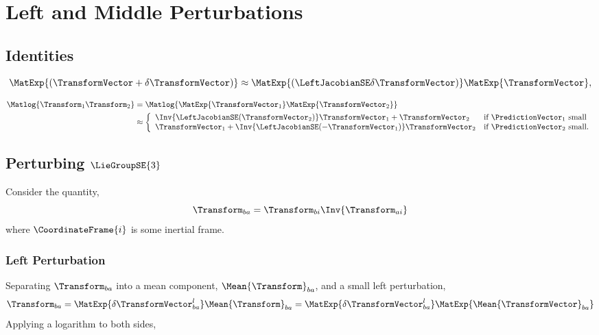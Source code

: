 \chapter{Left and Middle Perturbations}

\section{Identities}
\begin{equation}
\label{eq:identity_dxi}
\MatExp{( \TransformVector + \delta \TransformVector)} \approx \MatExp{(\LeftJacobianSE \delta \TransformVector)} \MatExp{\TransformVector},
\end{equation}

\begin{align}
\label{eq:identity_xi_small}
\Matlog{\Transform_1 \Transform_2} &= \Matlog{ \MatExp{\TransformVector_1} \MatExp{\TransformVector_2} } \nonumber \\
								  &\approx \left\{
	\begin{array}{ll}
		\Inv{\LeftJacobianSE(\TransformVector_2)} \TransformVector_1 + \TransformVector_2   & \mbox{if } \PredictionVector_1 ~ \mbox{small} \\
		\TransformVector_1 + \Inv{\LeftJacobianSE(-\TransformVector_1)} \TransformVector_2 & \mbox{if } \PredictionVector_2 ~ \mbox{small}.
	\end{array}
\right.
\end{align}

\section{Perturbing $\LieGroupSE{3}$}
Consider the quantity,
\begin{equation}
	\Transform_{ba} = \Transform_{bi} \Inv{\Transform_{ai}}
\end{equation}
where $\CoordinateFrame{i}$ is some inertial frame.


\subsection{Left Perturbation}
Separating $\Transform_{ba}$ into a mean component, $\Mean{\Transform}_{ba}$, and a small left perturbation, 
\begin{equation}
	\Transform_{ba} = \MatExp{\delta \TransformVector_{ba}^l} \Mean{\Transform}_{ba} = \MatExp{\delta \TransformVector_{ba}^l} \MatExp{\Mean{\TransformVector}_{ba}}
	\label{eq:left_perturb}
\end{equation}
Applying a logarithm to both sides,

